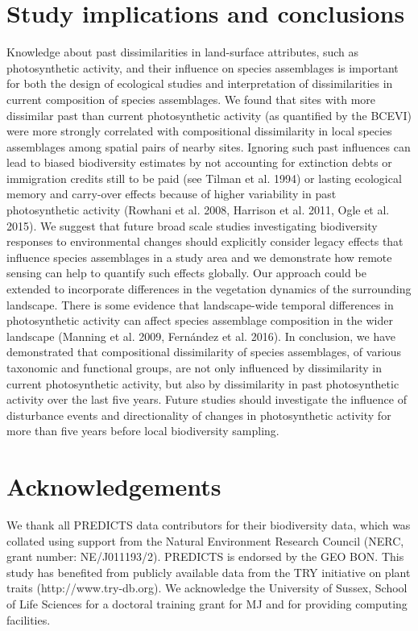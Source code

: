 \section{Study implications and conclusions}
Knowledge about past dissimilarities in land-surface attributes, such as photosynthetic activity, and their influence on species assemblages is important for both the design of ecological studies and interpretation of dissimilarities in current composition of species assemblages. We found that sites with more dissimilar past than current photosynthetic activity (as quantified by the BCEVI) were more strongly correlated with compositional dissimilarity in local species assemblages among spatial pairs of nearby sites. Ignoring such past influences can lead to biased biodiversity estimates by not accounting for extinction debts or immigration credits still to be paid (see Tilman et al. 1994) or lasting ecological memory and carry-over effects because of higher variability in past photosynthetic activity (Rowhani et al. 2008, Harrison et al. 2011, Ogle et al. 2015). We suggest that future broad scale studies investigating biodiversity responses to environmental changes should explicitly consider legacy effects that influence species assemblages in a study area and we demonstrate how remote sensing can help to quantify such effects globally. Our approach could be extended to incorporate differences in the vegetation dynamics of the surrounding landscape. There is some evidence that landscape-wide temporal differences in photosynthetic activity can affect species assemblage composition in the wider landscape (Manning et al. 2009, Fernández et al. 2016). In conclusion, we have demonstrated that compositional dissimilarity of species assemblages, of various taxonomic and functional groups, are not only influenced by dissimilarity in current photosynthetic activity, but also by dissimilarity in past photosynthetic activity over the last five years. Future studies should investigate the influence of disturbance events and directionality of changes in photosynthetic activity for more than five years before local biodiversity sampling.

\section{Acknowledgements}
We thank all PREDICTS data contributors for their biodiversity data, which was collated using support from the Natural Environment Research Council (NERC, grant number: NE/J011193/2). PREDICTS is endorsed by the GEO BON. This study has benefited from publicly available data from the TRY initiative on plant traits (http://www.try-db.org). We acknowledge the University of Sussex, School of Life Sciences for a doctoral training grant for MJ and for providing computing facilities.

